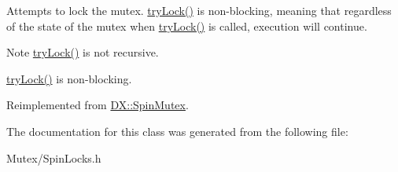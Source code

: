 Attempts to lock the mutex. \hyperlink{class_d_x_1_1_spin_yield_mutex_acd1ed560cf8afd7363a520beff4b5455}{try\-Lock()} is non-\/blocking, meaning that regardless of the state of the mutex when \hyperlink{class_d_x_1_1_spin_yield_mutex_acd1ed560cf8afd7363a520beff4b5455}{try\-Lock()} is called, execution will continue. 

\begin{DoxyNote}{Note}
\hyperlink{class_d_x_1_1_spin_yield_mutex_acd1ed560cf8afd7363a520beff4b5455}{try\-Lock()} is not recursive. 

\hyperlink{class_d_x_1_1_spin_yield_mutex_acd1ed560cf8afd7363a520beff4b5455}{try\-Lock()} is non-\/blocking. 
\end{DoxyNote}


Reimplemented from \hyperlink{class_d_x_1_1_spin_mutex_a395c28ec936bce90ac562039168a540a}{D\-X\-::\-Spin\-Mutex}.



The documentation for this class was generated from the following file\-:\begin{DoxyCompactItemize}
\item 
Mutex/Spin\-Locks.\-h\end{DoxyCompactItemize}
